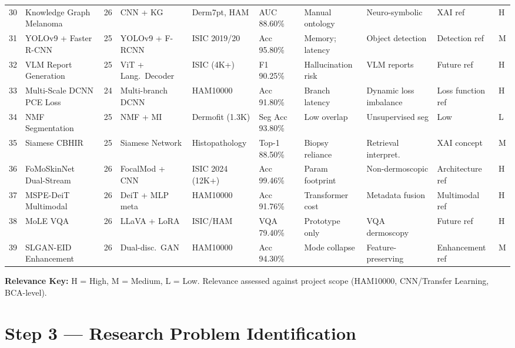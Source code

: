 \documentclass[11pt,a4paper]{article}
\begin{document}
\begin{landscape}
{\begin{longtable}{C{0.4cm} L{3cm} C{0.5cm} L{2.2cm} L{2.2cm} L{1.7cm} L{2cm} L{2.2cm} L{2.2cm} C{0.8cm}}
30 & Knowledge Graph Melanoma & 26 & CNN + KG & Derm7pt, HAM & AUC 88.60\% & Manual ontology & Neuro-symbolic & XAI ref & H \\
31 & YOLOv9 + Faster R-CNN & 25 & YOLOv9 + F-RCNN & ISIC 2019/20 & Acc 95.80\% & Memory; latency & Object detection & Detection ref & M \\
32 & VLM Report Generation & 25 & ViT + Lang.\ Decoder & ISIC (4K+) & F1 90.25\% & Hallucination risk & VLM reports & Future ref & H \\
33 & Multi-Scale DCNN PCE Loss & 24 & Multi-branch DCNN & HAM10000 & Acc 91.80\% & Branch latency & Dynamic loss imbalance & Loss function ref & H \\
34 & NMF Segmentation & 25 & NMF + MI & Dermofit (1.3K) & Seg Acc 93.80\% & Low overlap & Unsupervised seg & Low & L \\
35 & Siamese CBHIR & 25 & Siamese Network & Histopathology & Top-1 88.50\% & Biopsy reliance & Retrieval interpret. & XAI concept & M \\
36 & FoMoSkinNet Dual-Stream & 26 & FocalMod + CNN & ISIC 2024 (12K+) & Acc 99.46\% & Param footprint & Non-dermoscopic & Architecture ref & H \\
37 & MSPE-DeiT Multimodal & 26 & DeiT + MLP meta & HAM10000 & Acc 91.76\% & Transformer cost & Metadata fusion & Multimodal ref & H \\
38 & MoLE VQA & 26 & LLaVA + LoRA & ISIC/HAM & VQA 79.40\% & Prototype only & VQA dermoscopy & Future ref & H \\
39 & SLGAN-EID Enhancement & 26 & Dual-disc.\ GAN & HAM10000 & Acc 94.30\% & Mode collapse & Feature-preserving & Enhancement ref & M \\

\end{longtable}
}

{\footnotesize \textbf{Relevance Key:} H = High, M = Medium, L = Low. Relevance assessed against project scope (HAM10000, CNN/Transfer Learning, BCA-level).}

\end{landscape}

\newpage

\section{Step 3 --- Research Problem Identification}
\label{sec:step3}
\end{document}
